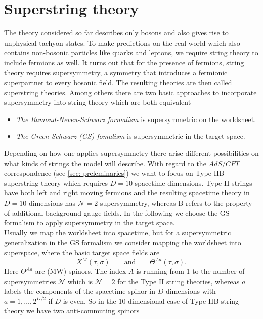 \section{Superstring theory}
The theory considered so far describes only bosons and also gives rise to unphysical tachyon states. To make predictions on the real world which also contains non-bosonic particles like quarks and leptons, we require string theory to include fermions as well. It turns out that for the presence of fermions, string theory requires supersymmetry, a symmetry that introduces a fermionic superpartner to every bosonic field. The resulting theories are then called superstring theories. Among others there are two basic approaches to incorporate supersymmetry into string theory \cite{Becker:2007zj} which are both equivalent
%
%
\begin{itemize}
\item \textit{The Ramond-Neveu-Schwarz formalism} is supersymmetric on the worldsheet.
%
\item \textit{The Green-Schwarz (GS) fomalism} is supersymmetric in the target space.
\end{itemize}
%
%
Depending on how one applies supersymmetry there arise different possibilities on what kinds of strings the model will describe. With regard to the $AdS/CFT$ correspondence (see \autoref{sec: preleminaries}) we want to focus on Type IIB superstring theory which requires $D=10$ spacetime dimensions. Type II strings have both left and right moving fermions and the resulting spacetime theory in $D=10$ dimensions has $\mathcal{N}=2$ supersymmetry, whereas B refers to the property of additional background gauge fields. In the following we choose the GS formalism to apply supersymmetry in the target space. \\
Usually we map the worldsheet into spacetime, but for a supersymmetric generalization in the GS formalism we consider mapping the worldsheet into superspace, where the basic target space fields are
%
%
\begin{equation}
X^{M}(\tau,\sigma) \qquad \text{and} \qquad \mathit{\Theta}^{Aa}(\tau,\sigma).
\end{equation}
%
%
Here $\mathit{\Theta}^{Aa}$ are  (MW) spinors. The index $A$ is running from 1 to the number of supersymmetries $\mathcal{N}$ which is $\mathcal{N}=2$ for the Type II string theories, whereas $a$ labels the components of the spacetime spinor in $D$ dimensions with $a=1,\ldots,2^{D/2}$ if $D$ is even. So in the 10 dimensional case of Type IIB string theory we have two anti-commuting spinors
